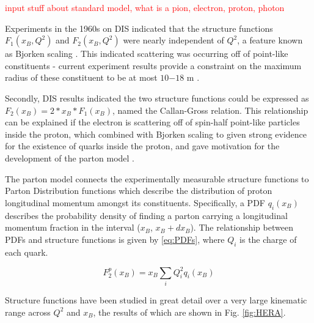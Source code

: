         \textcolor{red}{input stuff about standard model, what is a pion, electron, proton, photon}
        
        Experiments in the 1960s on DIS indicated that the structure functions $F_1(x_B,Q^2)$ and $F_2(x_B,Q^2)$ were nearly independent of $Q^2$, a feature known as Bjorken scaling \parencite{Bjorken1969InelasticNucleon}. This indicated scattering was occurring off of point-like constituents - current experiment results provide a constraint on the maximum radius of these constituent to be at most $10{-18}$ m \parencite{Thomson2013ModernPhysics}. 


        Secondly, DIS results indicated the two structure functions could be expressed as $F_2(x_B) = 2*x_B*F_1(x_B)$, named the Callan-Gross relation. This relationship can be explained if the electron is scattering off of spin-half point-like particles inside the proton, which combined with Bjorken scaling to given strong evidence for the existence of quarks inside the proton, and gave motivation for the development of the parton model \parencite{Feynman1969VeryHadrons}.

        
        
        The parton model connects the experimentally measurable structure functions to Parton Distribution functions which describe the distribution of proton longitudinal momentum amongst its constituents. Specifically, a PDF $q_i(x_B)$ describes the probability density of finding a parton carrying a longitudinal momentum fraction in the interval ($x_B$, $x_B + dx_B$). The relationship between PDFs and structure functions is given by \eqref{eq:PDFs}, where $Q_i$ is the charge of each quark.

        \begin{equation}\label{eq:PDFs}
            F_2^p(x_B) = x_B \sum_i Q^2_i q_i(x_B)
        \end{equation}
        
        Structure functions have been studied in great detail over a very large kinematic range across $Q^2$ and $x_B$, the results of which are shown in Fig. \ref{fig:HERA}.
    
